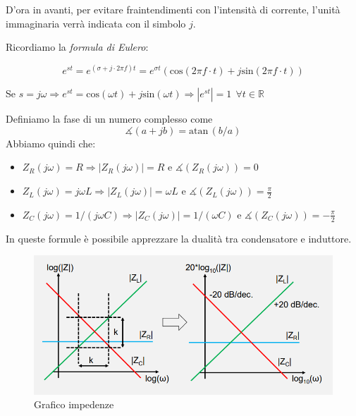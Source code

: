 \documentclass{article}
\begin{document}
\vspace{1mm}

D'ora in avanti, per evitare fraintendimenti con l'intensità di corrente, l'unità immaginaria verrà indicata con il simbolo $j$.

\vspace{1mm}

Ricordiamo la \textit{formula di Eulero}:

\[e^{st}= e^{(\sigma + j \cdot 2\pi f)t}= e^{\sigma t}(\textrm{cos} (2\pi f \cdot t) + j\textrm{sin} (2\pi f \cdot t))\]

Se $s = j\omega \Rightarrow e^{st} = \textrm{cos} (\omega t) + j\textrm{sin} (\omega t) \Rightarrow |e^{st}| = 1 \;\, \forall t \in \mathbb{R}$

\vspace{1mm}

Definiamo la fase di un numero complesso come
\[\measuredangle (a+jb) = \textrm{atan}\, (b/a)\]
Abbiamo quindi che:
\begin{itemize}
  \item $Z_R (j\omega) = R \Rightarrow |Z_R (j\omega)| = R$ e $\measuredangle (Z_R (j\omega)) = 0$
  \item $Z_L (j\omega) = j\omega L \Rightarrow |Z_L (j\omega)| = \omega L$ e $\measuredangle (Z_L (j\omega)) = \frac{\pi}{2}$
  \item $Z_C (j\omega) = 1/(j\omega C) \Rightarrow |Z_C (j\omega)| = 1/(\omega C)$ e $\measuredangle (Z_C (j\omega)) = -\frac{\pi}{2}$
\end{itemize}

In queste formule è possibile apprezzare la dualità tra condensatore e induttore.

\begin{figure}[h]
  \centering
  \includegraphics[scale=0.7]{IM_grafico_impedenze}
  \caption{Grafico impedenze}
  \label{Schema_grafico_impedenze}
\end{figure}
\end{document}
